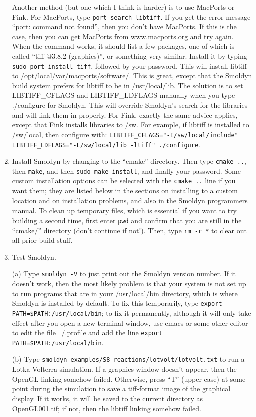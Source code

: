 \documentclass {book}
\newcommand {\ttt} {\texttt}
\begin{document}
\begin{enumerate}
Another method (but one which I think is harder) is to use MacPorts or Fink. For MacPorts, type \ttt{port search libtiff}. If you get the error message ``port: command not found'', then you don't have MacPorts. If this is the case, then you can get MacPorts from www.macports.org and try again. When the command works, it should list a few packages, one of which is called ``tiff @3.8.2 (graphics)'', or something very similar. Install it by typing \ttt{sudo port install tiff}, followed by your password. This will install libtiff to /opt/local/var/macports/software/. This is great, except that the Smoldyn build system prefers for libtiff to be in /usr/local/lib. The solution is to set LIBTIFF\_CFLAGS and LIBTIFF\_LDFLAGS manually when you type ./configure for Smoldyn. This will override Smoldyn's search for the libraries and will link them in properly. For Fink, exactly the same advice applies, except that Fink installs libraries to /sw. For example, if libtiff is installed to /sw/local, then configure with: \ttt{LIBTIFF\_CFLAGS="-I/sw/local/include" LIBTIFF\_LDFLAGS="-L/sw/local/lib -ltiff" ./configure}.

\item Install Smoldyn by changing to the ``cmake'' directory. Then type \ttt{cmake ..}, then \ttt{make}, and then \ttt{sudo make install}, and finally your password. Some custom installation options can be selected with the \ttt{cmake ..} line if you want them; they are listed below in the sections on installing to a custom location and on installation problems, and also in the Smoldyn programmers manual. To clean up temporary files, which is essential if you want to try building a second time, first enter \ttt{pwd} and confirm that you are still in the ``cmake/'' directory (don't continue if not!). Then, type \ttt{rm -r *} to clear out all prior build stuff.

\item Test Smoldyn.

(a) Type \ttt{smoldyn -V} to just print out the Smoldyn version number. If it doesn't work, then the most likely problem is that your system is not set up to run programs that are in your /usr/local/bin directory, which is where Smoldyn is installed by default. To fix this temporarily, type \ttt{export PATH=\$PATH:/usr/local/bin}; to fix it permanently, although it will only take effect after you open a new terminal window, use emacs or some other editor to edit the file ~/.profile and add the line \ttt{export PATH=\$PATH:/usr/local/bin}.

(b) Type \ttt{smoldyn examples/S8\_reactions/lotvolt/lotvolt.txt} to run a Lotka-Volterra simulation. If a graphics window doesn't appear, then the OpenGL linking somehow failed. Otherwise, press ``T'' (upper-case) at some point during the simulation to save a tiff-format image of the graphical display. If it works, it will be saved to the current directory as OpenGL001.tif; if not, then the libtiff linking somehow failed.

\end{enumerate}
\end{document}
